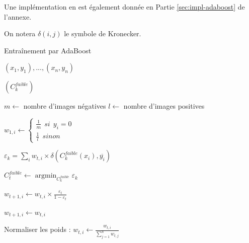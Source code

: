 \documentclass[12pt,a4paper]{article}
\DeclareMathOperator*{\argmin}{argmin}
\begin{document}
Une implémentation en est également donnée en Partie \ref{sec:impl-adaboost} de l'annexe.

On notera $\delta(i, j)$ le symbole de Kronecker.

\begin{algorithm}[H]
    \caption{Entraînement par AdaBoost}
    \label{algo:adaboost}
    \begin{algorithmic}
        \Input

        $(x_1, y_1), ..., (x_n, y_n)$ 

        $(C_k^{faible})$ 

        \EndInput
        \State $m \gets$ nombre d'images négatives
        \State $l \gets$ nombre d'images positives
         

            \State $w_{1, i} \gets \begin{cases} 
                \frac{1}{m} \:\: si \:\: y_i = 0 \\
                \frac{1}{l} \:\: sinon
                \end{cases}$ 
                
        \EndFor


                \State $\varepsilon_k = \sum_i w_{t,i} \times \delta(C_k^{faible}(x_i), \overline{y_i})$ 
            \EndFor

            \State $C_t^{faible} \gets \argmin_{C_k^{faible}} \varepsilon_k$
             

                \State $w_{t+1, i} \gets w_{t, i} \times \frac{\varepsilon_t}{1- \varepsilon_t}$ 

            \Else
                \State $w_{t+1, i} \gets w_{t, i}$ 
            \EndIf

            \EndFor
            \State Normaliser les poids : $w_{t, i} \gets \frac{w_{t, i}}{\sum_{j=1}^n w_{t, j}}$
        \EndFor
    \end{algorithmic}
\end{algorithm}
\end{document}
